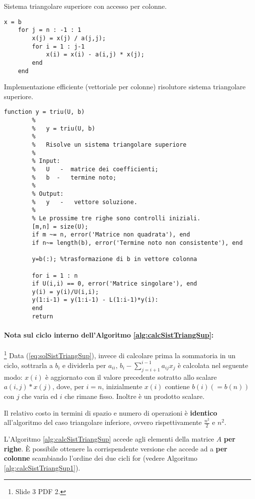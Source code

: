 \begin{algorithm}\caption{Sistema triangolare superiore con accesso per colonne.}
\label{alg:calcSistTriangSup1}
    \begin{lstlisting}[style=Matlab-editor]
    x = b
    for j = n : -1 : 1
        x(j) = x(j) / a(j,j);
        for i = 1 : j-1
            x(i) = x(i) - a(i,j) * x(j);
        end
    end
    \end{lstlisting}
\end{algorithm}

\begin{algorithm}
	\caption{Implementazione efficiente (vettoriale per colonne) risolutore sistema triangolare superiore.}\label{alg:triu}
	\begin{lstlisting}[style=Matlab-editor]
		function y = triu(U, b)
		%   
		%   y = triu(U, b)
		%
		%   Risolve un sistema triangolare superiore
		%
		% Input:
		%   U   -  matrice dei coefficienti;
		%   b  -   termine noto;
		%   
		% Output:
		%   y   -   vettore soluzione.
		%
		% Le prossime tre righe sono controlli iniziali.
		[m,n] = size(U);
		if m ~= n, error('Matrice non quadrata'), end
		if n~= length(b), error('Termine noto non consistente'), end
		
		y=b(:); %trasformazione di b in vettore colonna
		
		for i = 1 : n
		if U(i,i) == 0, error('Matrice singolare'), end
		y(i) = y(i)/U(i,i);
		y(1:i-1) = y(1:i-1) - L(1:i-1)*y(i):
		end
		return
	\end{lstlisting}
\end{algorithm}

\paragraph{Nota sul ciclo interno dell'Algoritmo \ref{alg:calcSistTriangSup}:} \footnote{Slide 3 PDF 2.}
Data (\ref{eq:solSistTriangSup}), invece di calcolare prima la sommatoria in un ciclo, sottrarla a $b_i$ e dividerla per $a_{ii},\, b_i-\sum_{j=i+1}^{i-1}a_{ij}x_j$ è calcolata nel seguente modo: $x(i)$ è aggiornato con il valore precedente sotratto allo scalare $a(i,j)*x(j)$, dove, per $i=n$, inizialmente $x(i)$ contiene $b(i)(=b(n))$ con $j$ che varia ed $i$ che rimane fisso. Inoltre è un prodotto scalare.

Il relativo costo in termini di spazio e numero di operazioni è \textbf{identico} all'algoritmo del caso triangolare inferiore, ovvero rispettivamente $\frac{n^2}{2}$ e $n^2$. 

L'Algoritmo \ref{alg:calcSistTriangSup} accede agli elementi della matrice $A$ \textbf{per righe}. È possibile ottenere la corrispendente versione che accede ad a \textbf{per colonne} scambiando l'ordine dei due cicli for (vedere Algoritmo \ref{alg:calcSistTriangSup1}).

